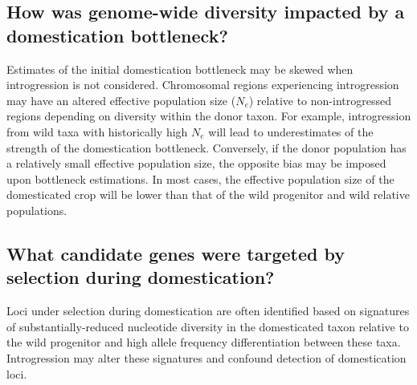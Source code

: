 \documentclass[11pt]{article}
\newcommand{\lwang}[1]{\textcolor{red}{ \emph{\scriptsize  #1}} } %
\newcommand{\gmj}[1]{\textcolor{blue}{ \emph{\scriptsize  #1}} } %
\begin{document}
\subsection*{How was genome-wide diversity impacted by a domestication bottleneck?}
Estimates of the initial domestication bottleneck may be skewed when introgression is not considered.
Chromosomal regions experiencing introgression may have an altered effective population size ($N_e$) relative to non-introgressed regions depending on diversity within the donor taxon.
For example, introgression from wild taxa with historically high $N_e$ will lead to underestimates of the strength of the domestication bottleneck.
Conversely, if the donor population has a relatively small effective population size, the opposite bias may be imposed upon bottleneck estimations.
In most cases, the effective population size of the domesticated crop will be lower than that of the wild progenitor and wild relative populations.

\subsection*{What candidate genes were targeted by selection during domestication?}
Loci under selection during domestication are often identified based on signatures of substantially-reduced nucleotide diversity in the domesticated taxon relative to the wild progenitor and high allele frequency differentiation between these taxa.
Introgression may alter these signatures and confound detection of domestication loci.


\end{document}
